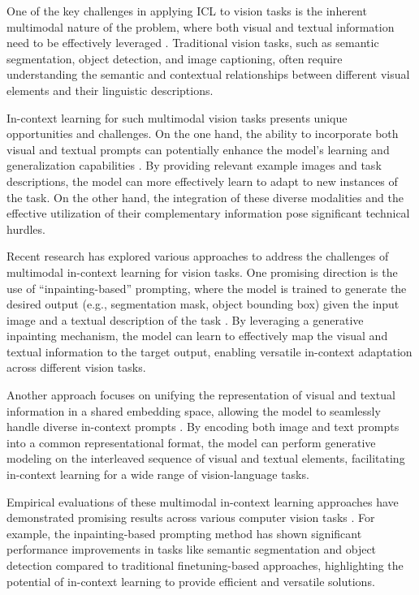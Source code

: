 \documentclass[11pt]{article}
\begin{document}
One of the key challenges in applying ICL to vision tasks is the inherent multimodal nature of the problem, where both visual and textual information need to be effectively leveraged \cite{ref55,ref56}. Traditional vision tasks, such as semantic segmentation, object detection, and image captioning, often require understanding the semantic and contextual relationships between different visual elements and their linguistic descriptions.

In-context learning for such multimodal vision tasks presents unique opportunities and challenges. On the one hand, the ability to incorporate both visual and textual prompts can potentially enhance the model's learning and generalization capabilities \cite{ref55}. By providing relevant example images and task descriptions, the model can more effectively learn to adapt to new instances of the task. On the other hand, the integration of these diverse modalities and the effective utilization of their complementary information pose significant technical hurdles.

Recent research has explored various approaches to address the challenges of multimodal in-context learning for vision tasks. One promising direction is the use of ``inpainting-based'' prompting, where the model is trained to generate the desired output (e.g., segmentation mask, object bounding box) given the input image and a textual description of the task \cite{ref55}. By leveraging a generative inpainting mechanism, the model can learn to effectively map the visual and textual information to the target output, enabling versatile in-context adaptation across different vision tasks.

Another approach focuses on unifying the representation of visual and textual information in a shared embedding space, allowing the model to seamlessly handle diverse in-context prompts \cite{ref25}. By encoding both image and text prompts into a common representational format, the model can perform generative modeling on the interleaved sequence of visual and textual elements, facilitating in-context learning for a wide range of vision-language tasks.

Empirical evaluations of these multimodal in-context learning approaches have demonstrated promising results across various computer vision tasks \cite{ref55,ref25}. For example, the inpainting-based prompting method has shown significant performance improvements in tasks like semantic segmentation and object detection compared to traditional finetuning-based approaches, highlighting the potential of in-context learning to provide efficient and versatile solutions.
\end{document}
